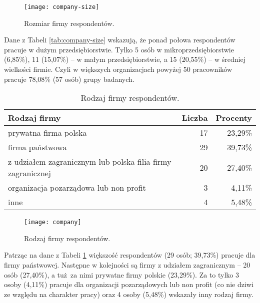 \begin{figure}[htb]
\begin{center}
\texttt{[image: company-size]}
\end{center}
\caption{Rozmiar firmy respondentów.}
\label{fig:company-size}
\end{figure}

Dane z Tabeli \ref{tab:company-size} wskazują, że ponad połowa respondentów pracuje w dużym przedsiębiorstwie. Tylko 5 osób w mikroprzedsiębiorstwie (6,85\%), 11 (15,07\%) -- w małym przedsiębiorstwie, a 15 (20,55\%) -- w średniej wielkości firmie. Czyli w większych organizacjach powyżej 50 pracowników pracuje 78,08\% (57 osób) grupy badanych.

\begin{table}[h!]
\begin{center}
\begin{tabular}{l r r}
Rodzaj firmy & Liczba & Procenty \\ \hline
prywatna firma polska & 17 & 23,29\% \\
firma państwowa & 29 & 39,73\% \\
z udziałem zagranicznym lub polska filia firmy zagranicznej & 20 & 27,40\% \\
organizacja pozarządowa lub non profit & 3 & 4,11\% \\
inne & 4 & 5,48\% \\
\end{tabular}
\end{center}
\caption{Rodzaj firmy respondentów.}
\label{tab:company}
\end{table}

\begin{figure}[htb]
\begin{center}
\texttt{[image: company]}
\end{center}
\caption{Rodzaj firmy respondentów.}
\label{fig:company}
\end{figure}

Patrząc na dane z Tabeli \ref{tab:company} większość respondentów (29 osób; 39,73\%) pracuje dla firmy państwowej. Następne w kolejności są firmy z udziałem zagranicznym -- 20 osób (27,40\%), a tuż za nimi prywatne firmy polskie (23,29\%). Za to tylko 3 osoby (4,11\%) pracuje dla organizacji pozarządowych lub non profit (co nie dziwi ze względu na charakter pracy) oraz 4 osoby (5,48\%) wskazały inny rodzaj firmy.
